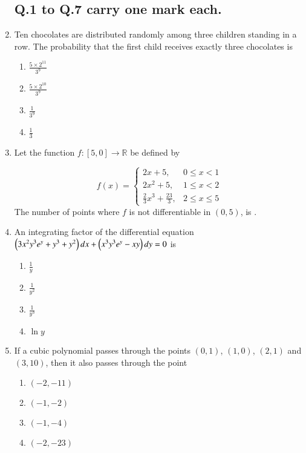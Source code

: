 \documentclass[journal]{IEEEtran}
\begin{document}
\begin{enumerate}

\subsection*{Q.1 to Q.7 carry one mark each.}

    \item Ten chocolates are distributed randomly among three children standing in a row. The probability that the first child receives exactly three chocolates is 
        \begin{enumerate}
            \item $\frac{5\times2^{11}}{3^9}$
            \item $\frac{5\times2^{10}}{3^9}$
            \item $\frac{1}{3^9}$
            \item $\frac{1}{3}$
        \end{enumerate}
    
    \item Let the function $f:[5,0]\to\mathbb{R}$ be defined by

        $$f(x)=
        \begin{cases}
            2x + 5, & 0 \leq x < 1 \\ 
            2x^2 + 5, & 1 \leq x < 2 \\ 
            \frac{2}{3}x^3 + \frac{23}{3}, & 2 \leq x \leq 5 
        \end{cases}$$
        The number of points where $f$ is not differentiable in $(0,5)$, is \underline{\hspace{1.5cm}}.
    
    \item An integrating factor of the differential equation $\left(3x^2y^3e^y+y^3+y^2\right)dx+\left(x^3y^3e^y-xy\right)dy=0$ is
        \begin{enumerate}
            \item $\frac{1}{y}$
            \item $\frac{1}{y^2}$
            \item $\frac{1}{y^3}$
            \item $\ln{y}$
        \end{enumerate}

    \item If a cubic polynomial passes through the points $(0, 1)$, $(1, 0)$, $(2, 1)$ and $(3, 10)$, then it also passes through the point 
        \begin{enumerate}
            \item $(-2,-11)$
            \item $(-1,-2)$
            \item $(-1,-4)$
            \item $(-2,-23)$
        \end{enumerate}


\end{enumerate}
\end{document}
